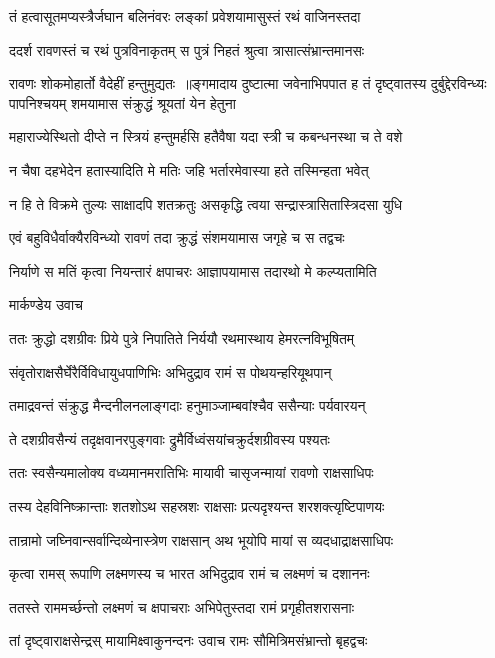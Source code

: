 \twolineshloka
{तं हत्वासूतमप्यस्त्रैर्जघान बलिनंवरः}
{लङ्कां प्रवेशयामासुस्तं रथं वाजिनस्तदा}


\threelineshloka
{ददर्श रावणस्तं च रथं पुत्रविनाकृतम्}
{स पुत्रं निहतं श्रुत्वा त्रासात्संभ्रान्तमानसः}
{}


रावणः शोकमोहार्तो वैदेहीं हन्तुमुद्यतः ॥ङ्गमादाय दुष्टात्मा जवेनाभिपपात ह
\twolineshloka
{तं दृष्ट्वातस्य दुर्बुद्देरविन्ध्यः पापनिश्चयम्}
{शमयामास संक्रुद्धं श्रूयतां येन हेतुना}


\twolineshloka
{महाराज्येस्थितो दीप्ते न स्त्रियं हन्तुमर्हसि}
{हतैवैषा यदा स्त्री च कबन्धनस्था च ते वशे}


\twolineshloka
{न चैषा दहभेदेन हतास्यादिति मे मतिः}
{जहि भर्तारमेवास्या हते तस्मिन्हता भवेत्}


\twolineshloka
{न हि ते विक्रमे तुल्यः साक्षादपि शतक्रतुः}
{असकृद्धि त्वया सन्द्रास्त्रासितास्त्रिदसा युधि}


\twolineshloka
{एवं बहुविधैर्वाक्यैरविन्ध्यो रावणं तदा}
{क्रुद्धं संशमयामास जगृहे च स तद्वचः}


\twolineshloka
{निर्याणे स मतिं कृत्वा नियन्तारं क्षपाचरः}
{आज्ञापयामास तदारथो मे कल्प्यतामिति}


\twolineshloka
{मार्कण्डेय उवाच}
{}


\twolineshloka
{ततः क्रुद्धो दशग्रीवः प्रिये पुत्रे निपातिते}
{निर्ययौ रथमास्थाय हेमरत्नविभूषितम्}


\twolineshloka
{संवृतोराक्षसैर्घेरैर्विविधायुधपाणिभिः}
{अभिदुद्राव रामं स पोथयन्हरियूथपान्}


\twolineshloka
{तमाद्रवन्तं संक्रुद्ध मैन्दनीलनलाङ्गदाः}
{हनुमाञ्जाम्बवांश्चैव ससैन्याः पर्यवारयन्}


\twolineshloka
{ते दशग्रीवसैन्यं तदृक्षवानरपुङ्गवाः}
{द्रुमैर्विध्वंसयांचक्रुर्दशग्रीवस्य पश्यतः}


\twolineshloka
{ततः स्वसैन्यमालोक्य वध्यमानमरातिभिः}
{मायावी चासृजन्मायां रावणो राक्षसाधिपः}


\twolineshloka
{तस्य देहविनिष्क्रान्ताः शतशोऽथ सहस्रशः}
{राक्षसाः प्रत्यदृश्यन्त शरशक्त्यृष्टिपाणयः}


\twolineshloka
{तान्रामो जघ्निवान्सर्वान्दिव्येनास्त्रेण राक्षसान्}
{अथ भूयोपि मायां स व्यदधाद्राक्षसाधिपः}


\twolineshloka
{कृत्वा रामस् रूपाणि लक्ष्मणस्य च भारत}
{अभिदुद्राव रामं च लक्ष्मणं च दशाननः}


\twolineshloka
{ततस्ते राममर्च्छन्तो लक्ष्मणं च क्षपाचराः}
{अभिपेतुस्तदा रामं प्रगृहीतशरासनाः}


\twolineshloka
{तां दृष्ट्वाराक्षसेन्द्रस् मायामिक्ष्वाकुनन्दनः}
{उवाच रामः सौमित्रिमसंभ्रान्तो बृहद्वचः}



